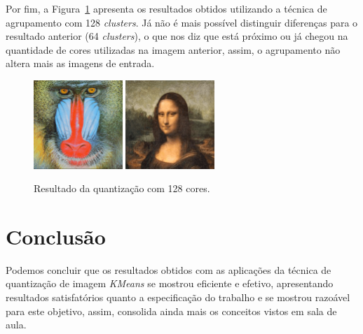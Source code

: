 \documentclass[twoside,twocolumn]{article}
\begin{document}
Por fim, a Figura~\ref{quant_128} apresenta os resultados obtidos utilizando a técnica de agrupamento com 128 \textit{clusters}. Já não é mais possível distinguir diferenças para o resultado anterior (64 \textit{clusters}), o que nos diz que está próximo ou já chegou na quantidade de cores utilizadas na imagem anterior, assim, o agrupamento não altera mais as imagens de entrada.

\begin{figure}[H]
\begin{center}
	\includegraphics[height=3.35cm]{figures/baboon_128.png} \quad
	\includegraphics[height=3.35cm]{figures/monalisa_128.png}
\caption{Resultado da quantização com 128 cores.} \label{quant_128}
\end{center}
\end{figure}


\section{Conclusão}

Podemos concluir que os resultados obtidos com as aplicações da técnica de quantização de imagem \textit{KMeans} se mostrou eficiente e efetivo, apresentando resultados satisfatórios quanto a especificação do trabalho e se mostrou razoável para este objetivo, assim, consolida ainda mais os conceitos vistos em sala de aula.

\end{document}
